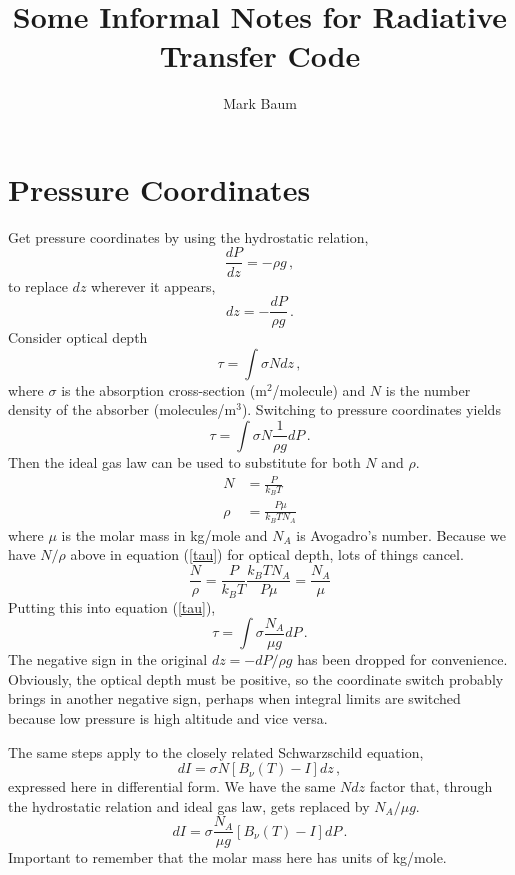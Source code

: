 \documentclass[10pt]{article}
\title{Some Informal Notes for Radiative Transfer Code}
\author{Mark Baum}
\begin{document}
\small

\maketitle

\section*{Pressure Coordinates}

Get pressure coordinates by using the hydrostatic relation,
\begin{equation}
	\frac{dP}{dz} = -\rho g \, ,
\end{equation}
to replace $dz$ wherever it appears,
\begin{equation}
	dz = -\frac{dP}{\rho g} \, .
\end{equation}
Consider optical depth
\begin{equation}
	\tau	 = \int \sigma N dz \, ,
\end{equation}
where $\sigma$ is the absorption cross-section (m$^2$/molecule) and $N$ is the number density of the absorber (molecules/m$^3$). Switching to pressure coordinates yields
\begin{equation}
	\tau	 = \int \sigma N \frac{1}{\rho g} dP \, .
	\label{tau}
\end{equation}
Then the ideal gas law can be used to substitute for both $N$ and $\rho$.
\begin{align}
	N &= \frac{P}{k_B T} \\[1ex]
	\rho &= \frac{P \mu}{k_B T N_A}
\end{align}
where $\mu$ is the molar mass in kg/mole and $N_A$ is Avogadro's number. Because we have $N/\rho$ above in equation (\ref{tau}) for optical depth, lots of things cancel.
\begin{equation}
	\frac{N}{\rho} = \frac{P}{k_B T} \frac{k_B T N_A}{P \mu} = \frac{N_A}{\mu}
\end{equation}
Putting this into equation (\ref{tau}),
\begin{equation}
	\tau = \int \sigma \frac{N_A}{\mu g} dP \, .
\end{equation}
The negative sign in the original $dz=-dP/\rho g$ has been dropped for convenience. Obviously, the optical depth must be positive, so the coordinate switch probably brings in another negative sign, perhaps when integral limits are switched because low pressure is high altitude and vice versa.

The same steps apply to the closely related Schwarzschild equation,
\begin{equation}
	dI = \sigma N [B_{\nu}(T) - I] dz \, ,
\end{equation}
expressed here in differential form. We have the same $N dz$ factor that, through the hydrostatic relation and ideal gas law, gets replaced by $N_A/\mu g$.
\begin{equation}
	dI = \sigma	\frac{N_A}{\mu g} [B_{\nu}(T) - I] dP \, .
\end{equation}
Important to remember that the molar mass here has units of kg/mole.
\end{document}
